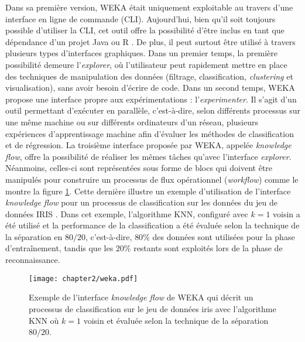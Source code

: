 Dans sa première version, \acs{WEKA} était uniquement exploitable au travers d'une interface en ligne de commande (\acs{CLI}). Aujourd'hui, bien qu'il soit toujours possible d'utiliser la \acs{CLI}, cet outil offre la possibilité d'être inclus en tant que dépendance d'un projet Java ou \textsf{R} \citep{Hornik2009}. De plus, il peut surtout être utilisé à travers plusieurs types d'interfaces graphiques. Dans un premier temps, la première possibilité demeure l'\emph{explorer}, où l'utilisateur peut rapidement mettre en place des techniques de manipulation des données (filtrage, classification, \textit{clustering} et visualisation), sans avoir besoin d'écrire de code. Dans un second temps, \acs{WEKA} propose une interface propre aux expérimentations : l'\emph{experimenter}. Il s'agit d'un outil permettant d'exécuter en parallèle, c'est-à-dire, selon différents processus sur une même machine ou sur différents ordinateurs d'un réseau, plusieurs expériences d'apprentissage machine afin d'évaluer les méthodes de classification et de régression. La troisième interface proposée par \acs{WEKA}, appelée \emph{knowledge flow}, offre la possibilité de réaliser les mêmes tâches qu'avec l'interface \emph{explorer}. Néanmoins, celles-ci sont représentées sous forme de blocs qui doivent être manipulés pour construire un processus de flux opérationnel (\textit{workflow}) comme le montre la figure \ref{fig:weka}. Cette dernière illustre un exemple d'utilisation de l'interface \emph{knowledge flow} pour un processus de classification sur les données du jeu de données IRIS \citep{Asuncion2007}. Dans cet exemple, l'algorithme \acs{KNN}, configuré avec $k=1$ voisin a été utilisé et la performance de la classification a été évaluée selon la technique de la séparation en $80/20$, c'est-à-dire, $80\%$ des données sont utilisées pour la phase d'entraînement, tandis que les $20\%$ restants sont exploités lors de la phase de reconnaissance.

\begin{figure}[H]
	\centering
	\texttt{[image: chapter2/weka.pdf]}
        \caption{Exemple de l'interface \textit{knowledge flow} de \acs{WEKA} qui décrit un processus de classification sur le jeu de données iris avec l'algorithme \acs{KNN} où $k=1$ voisin et évaluée selon la technique de la séparation $80/20$.}
	\label{fig:weka}
\end{figure}

